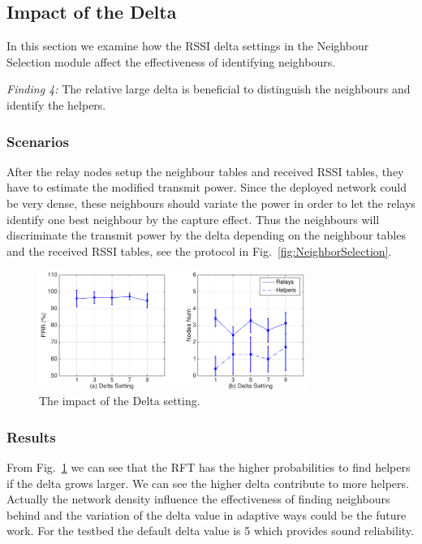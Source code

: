 \documentclass[conference]{IEEEtran}
\begin{document}
\subsection{Impact of the Delta}
\label{sec:testdelta}
In this section we examine how the RSSI delta settings in the Neighbour Selection module affect the effectiveness of identifying neighbours.

\emph{Finding 4:} 
The relative large delta is beneficial to distinguish the neighbours and identify the helpers.
\subsubsection{Scenarios}
After the relay nodes setup the neighbour tables and received RSSI tables, they have to estimate the modified transmit power. Since the deployed network could be very dense, these neighbours should variate the power in order to let the relays identify one best neighbour by the capture effect. Thus the neighbours will discriminate the transmit power by the delta depending on the neighbour tables and the received RSSI tables, see the protocol in Fig.~\ref{fig:NeighborSelection}.
\begin{figure}
\centering
\includegraphics[height=3.87cm]{errorbar_delta3.png}
\caption{The impact of the Delta setting.}
\label{fig:testdelta}
\end{figure}
\subsubsection{Results}
From Fig.~\ref{fig:testdelta} we can see that the RFT has the higher probabilities to find helpers if the delta grows larger. We can see the higher delta contribute to more helpers. Actually the network density influence the effectiveness of finding neighbours behind and the variation of the delta value in adaptive ways could be the future work. For the testbed the default delta value is 5 which provides sound reliability.
\end{document}
